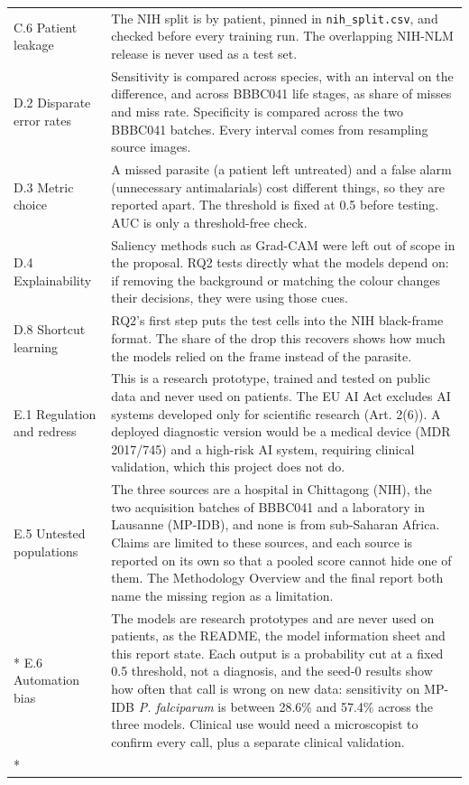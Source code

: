 \documentclass[11pt,a4paper]{article}
\begin{document}
{\begin{longtable}{@{}>{\raggedright\arraybackslash\hspace{0pt}}p{79.7pt}>{\raggedright\arraybackslash\hspace{0pt}}p{256.3pt}@{}}
C.6 Patient leakage & The NIH split is by patient, pinned in \texttt{nih\_\allowbreak{}split.\allowbreak{}csv}, and checked before every training run. The overlapping NIH-NLM release is never used as a test set. \\
D.2 Disparate error rates & Sensitivity is compared across species, with an interval on the difference, and across BBBC041 life stages, as share of misses and miss rate. Specificity is compared across the two BBBC041 batches. Every interval comes from resampling source images. \\
D.3 Metric choice & A missed parasite (a patient left untreated) and a false alarm (unnecessary antimalarials) cost different things, so they are reported apart. The threshold is fixed at 0.5 before testing. AUC is only a threshold-free check. \\
D.4 Explainability & Saliency methods such as Grad-CAM were left out of scope in the proposal. RQ2 tests directly what the models depend on: if removing the background or matching the colour changes their decisions, they were using those cues. \\
D.8 Shortcut learning & RQ2's first step puts the test cells into the NIH black-frame format. The share of the drop this recovers shows how much the models relied on the frame instead of the parasite. \\
E.1 Regulation and redress & This is a research prototype, trained and tested on public data and never used on patients. The EU AI Act excludes AI systems developed only for scientific research (Art. 2(6)). A deployed diagnostic version would be a medical device (MDR 2017/745) and a high-risk AI system, requiring clinical validation, which this project does not do. \\
E.5 Untested populations & The three sources are a hospital in Chittagong (NIH), the two acquisition batches of BBBC041 and a laboratory in Lausanne (MP-IDB), and none is from sub-Saharan Africa. Claims are limited to these sources, and each source is reported on its own so that a pooled score cannot hide one of them. The Methodology Overview and the final report both name the missing region as a limitation. \\*
E.6 Automation bias & The models are research prototypes and are never used on patients, as the README, the model information sheet and this report state. Each output is a probability cut at a fixed 0.5 threshold, not a diagnosis, and the seed-0 results show how often that call is wrong on new data: sensitivity on MP-IDB \emph{P. falciparum} is between 28.6\% and 57.4\% across the three models. Clinical use would need a microscopist to confirm every call, plus a separate clinical validation. \\*
\end{longtable}}
\end{document}
